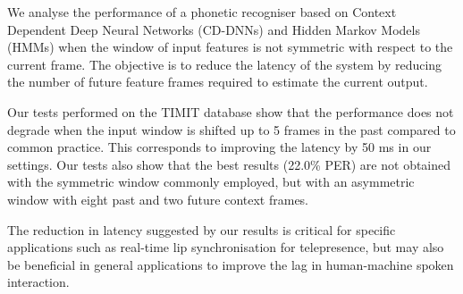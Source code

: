 We analyse the performance of a phonetic recogniser based on Context Dependent Deep Neural Networks (CD-DNNs) and Hidden Markov Models (HMMs) when the window of input features is not symmetric with respect to the current frame.
The objective is to reduce the latency of the system by reducing the number of future feature frames required to estimate the current output.

Our tests performed on the TIMIT database show that the performance does not degrade when the input window is shifted up to 5 frames in the past compared to common practice.
This corresponds to improving the latency by 50 ms in our settings.
Our tests also show that the best results (22.0\% PER) are not obtained with the symmetric window commonly employed, but with an asymmetric window with eight past and two future context frames.

The reduction in latency suggested by our results is critical for specific applications such as real-time lip synchronisation for telepresence, but may also be beneficial in general applications to improve the lag in human-machine spoken interaction.
\endinput

